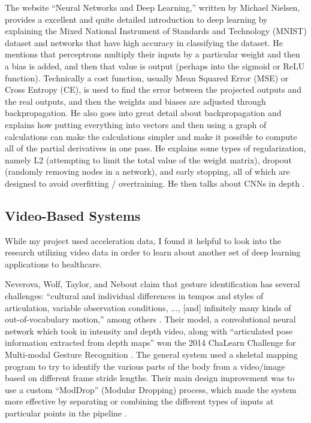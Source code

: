\documentclass[]{report}
\begin{document}
The website ``Neural Networks and Deep Learning,'' written by Michael Nielsen, provides a excellent and quite detailed introduction to deep learning by explaining the Mixed National Instrument of Standards and Technology (MNIST) dataset and networks that have high accuracy in classifying the dataset. He mentions that perceptrons multiply their inputs by a particular weight and then a bias is added, and then that value is output (perhaps into the sigmoid or ReLU function). Technically a cost function, usually Mean Squared Error (MSE) or Cross Entropy (CE), is used to find the error between the projected outputs and the real outputs, and then the weights and biases are adjusted through backpropagation. He also goes into great detail about backpropagation and explains how putting everything into vectors and then using a graph of calculations can make the calculations simpler and make it possible to compute all of the partial derivatives in one pass. He explains some types of regularization, namely L2 (attempting to limit the total value of the weight matrix), dropout (randomly removing nodes in a network), and early stopping, all of which are designed to avoid overfitting / overtraining. He then talks about CNNs in depth \cite{NNDL}.


\subsection{Video-Based Systems}

While my project used acceleration data, I found it helpful to look into the research utilizing video data in order to learn about another set of deep learning applications to healthcare.

Neverova, Wolf, Taylor, and Nebout claim that gesture identification has several challenges: ``cultural and individual differences in tempos and styles of articulation, variable observation conditions, ..., [and] infinitely many kinds of out-of-vocabulary motion,'' among others \cite{Neverova}. Their model, a convolutional neural network which took in intensity and depth video, along with ``articulated pose information extracted from depth maps'' won the 2014 ChaLearn Challenge for Multi-modal Gesture Recognition \cite{Neverova}. The general system used a skeletal mapping program to try to identify the various parts of the body from a video/image based on different frame stride lengths. Their main design improvement was to use a custom ``ModDrop'' (Modular Dropping) process, which made the system more effective by separating or combining the different types of inputs at particular points in the pipeline \cite{Neverova}. 
\end{document}
